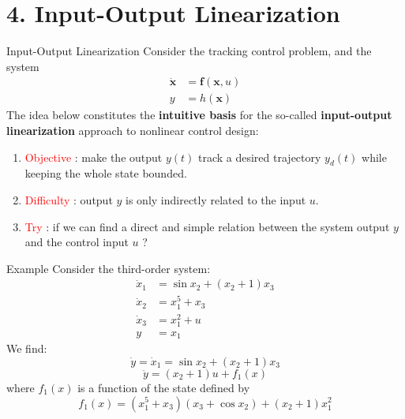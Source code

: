 \documentclass{beamer}
\renewcommand{\vec}[1]{\ensuremath{\boldsymbol{#1}}} %
\begin{document}
\section{4. Input-Output Linearization}


\begin{frame}{Input-Output Linearization}
Consider the tracking control problem, and the system
    \begin{equation}\label{tracking-control}
      \begin{aligned}
        \dot{\vec{x}} &= \vec{f}(\vec{x}, u) \\
        y &= h(\vec{x})
      \end{aligned}
    \end{equation}
The idea below constitutes the \textbf{intuitive basis} for the so-called \textbf{input-output linearization} approach to nonlinear control design:
    \begin{enumerate}
      \item \textcolor{red}{Objective} : make the output $y(t)$ track a desired trajectory $y_{d}(t)$ while keeping the whole state bounded.
      \item \textcolor{red}{Difficulty} : output $y$ is only indirectly related to the input $u$.
      \item \textcolor{red}{Try} : if we can find a direct and simple relation between the system output $y$ and the control input $u$ ?
    \end{enumerate}
\end{frame}


\begin{frame}{Example}
Consider the third-order system:
    \begin{equation}\label{third-order}
      \begin{aligned}
        \dot{x}_{1} &= \sin x_{2}+(x_{2}+1)x_{3} \\
        \dot{x}_{2} &= x_{1}^{5}+x_{3} \\
        \dot{x}_{3} &= x_{1}^{2}+u \\
        y &= x_{1}
      \end{aligned}
    \end{equation}
We find:
    $$
    \dot{y}=\dot{x}_{1}=\sin x_{2}+\left(x_{2}+1\right) x_{3}
    $$
    \begin{equation}\label{double}
      \ddot{y}=\left(x_{2}+1\right) u+f_{1}(x)
    \end{equation}
where $f_{1}(x)$ is a function of the state defined by
    \begin{equation}\label{f1x}
        f_{1}(x)=\left(x_{1}^{5}+x_{3}\right)\left(x_{3}+\cos x_{2}\right)+\left(x_{2}+1\right) x_{1}^{2}
    \end{equation}
\end{frame}
\end{document}
